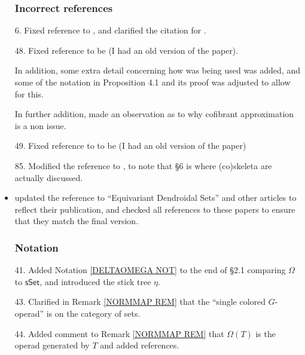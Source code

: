 \documentclass{article}
\begin{document}
\begin{itemize}
      \subsubsection*{Incorrect references}
      
\item[6.] Fixed reference \cite[Prop. 3.21]{BP17} to \cite[Prop. 3.23]{BP17}, and clarified the citation for \cite{BP17}.

\item[48.] Fixed reference \cite[Prop. 3.4.18]{Hir03} to be \cite[Thm. 3.3.18]{Hir03} (I had an old version of the paper).
      
      In addition, some extra detail concerning how \cite[Prop. 3.3.18]{Hir03} was being used was added, and some of the notation in Proposition 4.1 and its proof was adjusted to allow for this.
      
      In further addition, made an observation as to why cofibrant approximation is a non issue.
      
\item[49.] Fixed reference to \cite[Thm. 3.3.8]{Hir03} to be \cite[Thm. 3.2.13]{Hir03} (I had an old version of the paper)
      
\item[85.] Modified the reference \cite[\S 4]{BM11} to \cite[\S 4,\S 6]{BM11}, to note that \S 6 is where (co)skeleta are actually discussed.
      
\item updated the reference to ``Equivariant Dendroidal Sets'' and other articles to reflect their publication,
      and checked all references to these papers to ensure that they match the final version. %




      \subsubsection*{Notation}
\item[41.] Added Notation \ref{DELTAOMEGA NOT} to the end of \S 2.1 comparing $\Omega$ to $\mathsf{sSet}$, and introduced the stick tree $\eta$. %

      
\item[43.] Clarified in Remark \ref{NORMMAP REM} that the ``single colored $G$-operad'' is on the category of sets. %

      
\item[44.] Added comment to Remark \ref{NORMMAP REM} that $\Omega(T)$ is the operad generated by $T$ and added references. %


\end{itemize}
\end{document}
